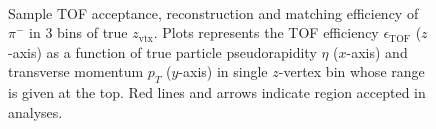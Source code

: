 \begin{figure}[h!]
{\begin{subfigure}[b]{\linewidth}
		\end{subfigure}
	}%
	\quad%
	\parbox{0.485\textwidth}{
		\centering
		\begin{subfigure}[b]{\linewidth}\addtocounter{subfigure}{-2}
		\end{subfigure}\\[5pt]
		\begin{minipage}[t][0.78\linewidth][t]{\linewidth}\vspace{10pt}
			\caption[Sample plotz of TOF acceptance, reconstruction and matching efficiency of $\pi^{-}$.]{Sample TOF acceptance, reconstruction and matching efficiency of $\pi^{-}$ in 3 bins of true $z_{\text{vtx}}$. Plots represents the TOF efficiency $\epsilon_{\text{TOF}}$ ($z$-axis) as a function of true particle pseudorapidity $\eta$ ($x$-axis) and transverse momentum $p_{T}$ ($y$-axis) in single $z$-vertex bin whose range is given at the top. Red lines and arrows indicate region accepted in analyses.}\label{fig:tofEff_pion_sample}
		\end{minipage}
	}
\end{figure}


